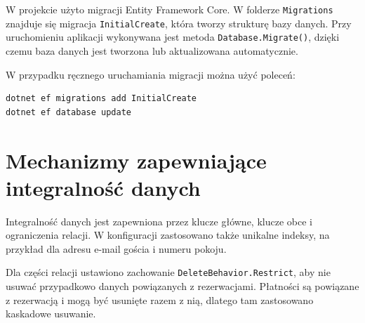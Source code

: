 W projekcie użyto migracji Entity Framework Core. W folderze \texttt{Migrations} znajduje się migracja \texttt{InitialCreate}, która tworzy strukturę bazy danych. Przy uruchomieniu aplikacji wykonywana jest metoda \texttt{Database.Migrate()}, dzięki czemu baza danych jest tworzona lub aktualizowana automatycznie.

W przypadku ręcznego uruchamiania migracji można użyć poleceń:

\begin{lstlisting}[style=textStyle,caption={Polecenia migracji EF Core},label={lst:migracje}]
dotnet ef migrations add InitialCreate
dotnet ef database update
\end{lstlisting}

\section{Mechanizmy zapewniające integralność danych}

Integralność danych jest zapewniona przez klucze główne, klucze obce i ograniczenia relacji. W konfiguracji zastosowano także unikalne indeksy, na przykład dla adresu e-mail gościa i numeru pokoju.

Dla części relacji ustawiono zachowanie \texttt{DeleteBehavior.Restrict}, aby nie usuwać przypadkowo danych powiązanych z rezerwacjami. Płatności są powiązane z rezerwacją i mogą być usunięte razem z nią, dlatego tam zastosowano kaskadowe usuwanie.
